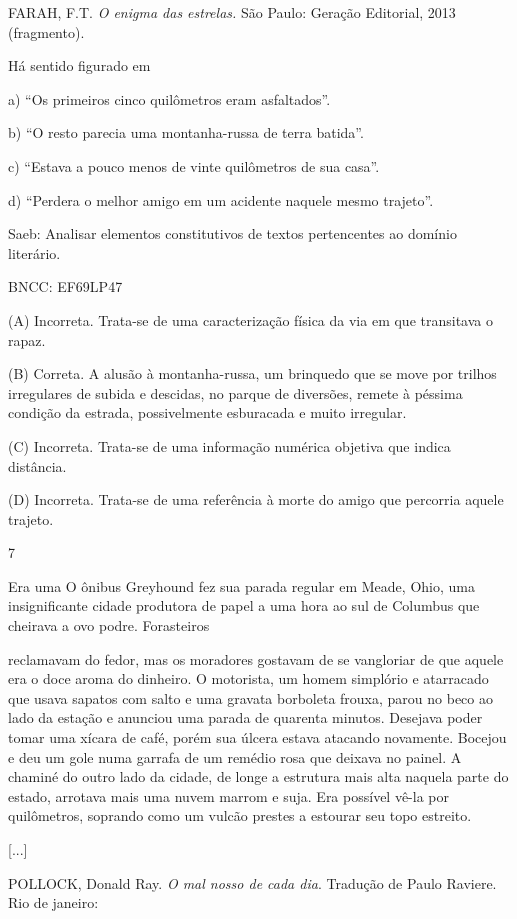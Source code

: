 FARAH, F.T. \emph{O enigma das estrelas.} São Paulo: Geração Editorial,
2013 (fragmento).

Há sentido figurado em

a) ``Os primeiros cinco quilômetros eram asfaltados''.

b) ``O resto parecia uma montanha-russa de terra batida''.

c) ``Estava a pouco menos de vinte quilômetros de sua casa''.

d) ``Perdera o melhor amigo em um acidente naquele mesmo trajeto''.

Saeb: Analisar elementos constitutivos de textos pertencentes ao domínio
literário.

BNCC: EF69LP47

(A) Incorreta. Trata-se de uma caracterização física da via em que
transitava o rapaz.

(B) Correta. A alusão à montanha-russa, um brinquedo que se move por
trilhos irregulares de subida e descidas, no parque de diversões, remete
à péssima condição da estrada, possivelmente esburacada e muito
irregular.

(C) Incorreta. Trata-se de uma informação numérica objetiva que indica
distância.

(D) Incorreta. Trata-se de uma referência à morte do amigo que percorria
aquele trajeto.

\num{7}

Era uma O ônibus Greyhound fez sua parada regular em Meade, Ohio, uma
insignificante cidade produtora de papel a uma hora ao sul de Columbus
que cheirava a ovo podre. Forasteiros

reclamavam do fedor, mas os moradores gostavam de se vangloriar de que
aquele era o doce aroma do dinheiro. O motorista, um homem simplório e
atarracado que usava sapatos com salto e uma gravata borboleta frouxa,
parou no beco ao lado da estação e anunciou uma parada de quarenta
minutos. Desejava poder tomar uma xícara de café, porém sua úlcera
estava atacando novamente. Bocejou e deu um gole numa garrafa de um
remédio rosa que deixava no painel. A chaminé do outro lado da cidade,
de longe a estrutura mais alta naquela parte do estado, arrotava mais
uma nuvem marrom e suja. Era possível vê-la por quilômetros, soprando
como um vulcão prestes a estourar seu topo estreito.

{[}...{]}

POLLOCK, Donald Ray. \emph{O mal nosso de cada dia}. Tradução de Paulo
Raviere. Rio de janeiro:

